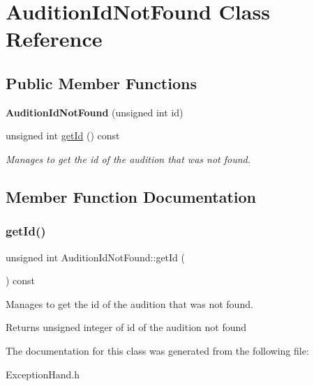\hypertarget{class_audition_id_not_found}{}\section{Audition\+Id\+Not\+Found Class Reference}
\label{class_audition_id_not_found}
\subsection*{Public Member Functions}
\begin{DoxyCompactItemize}
\item 
\mbox{\label{class_audition_id_not_found_a1a66368813a6e60870a8e4ab20a6cd2a}} 
{\bfseries Audition\+Id\+Not\+Found} (unsigned int id)
\item 
unsigned int \hyperlink{class_audition_id_not_found_a6cd88f674bdd80a9fd383c0fb5271ddb}{get\+Id} () const
\begin{DoxyCompactList}\small\item\em Manages to get the id of the audition that was not found. \end{DoxyCompactList}\end{DoxyCompactItemize}


\subsection{Member Function Documentation}
\mbox{\label{class_audition_id_not_found_a6cd88f674bdd80a9fd383c0fb5271ddb}} 
\subsubsection{\texorpdfstring{get\+Id()}{getId()}}
{\footnotesize\ttfamily unsigned int Audition\+Id\+Not\+Found\+::get\+Id (\begin{DoxyParamCaption}{ }\end{DoxyParamCaption}) const\hspace{0.3cm}{\ttfamily [inline]}}



Manages to get the id of the audition that was not found. 

\begin{DoxyReturn}{Returns}
unsigned integer of id of the audition not found 
\end{DoxyReturn}


The documentation for this class was generated from the following file\+:\begin{DoxyCompactItemize}
\item 
Exception\+Hand.\+h\end{DoxyCompactItemize}
